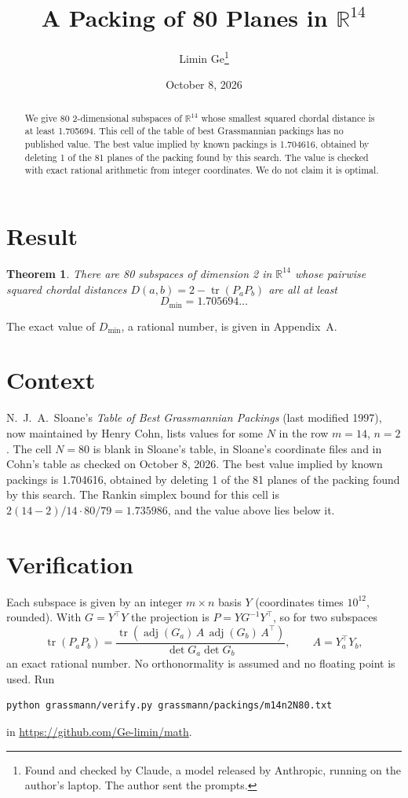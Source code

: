\documentclass[11pt,a4paper]{article}
\title{A Packing of 80 Planes in $\mathbb{R}^{14}$}
\author{Limin Ge\thanks{Found and checked by Claude, a model released by Anthropic, running on the author's laptop. The author sent the prompts.}}
\date{October 8, 2026}
\newtheorem*{theorem}{Theorem}
\begin{document}
\maketitle
\begin{abstract}
We give 80 2-dimensional subspaces of $\mathbb{R}^{14}$ whose smallest squared chordal distance is at least 1.705694. This cell of the table of best Grassmannian packings has no published value. The best value implied by known packings is 1.704616, obtained by deleting 1 of the 81 planes of the packing found by this search. The value is checked with exact rational arithmetic from integer coordinates. We do not claim it is optimal.
\end{abstract}

\section{Result}
\begin{theorem}
There are 80 subspaces of dimension 2 in $\mathbb{R}^{14}$ whose pairwise squared chordal distances $D(a,b) = 2 - \operatorname{tr}(P_aP_b)$ are all at least
\[ D_{\min} = 1.705694\ldots \]
\end{theorem}
The exact value of $D_{\min}$, a rational number, is given in Appendix~A.


\section{Context}
N.~J.~A.~Sloane's \emph{Table of Best Grassmannian Packings} (last modified 1997), now maintained by Henry Cohn, lists values for some $N$ in the row $m=14$, $n=2$. The cell $N=80$ is blank in Sloane's table, in Sloane's coordinate files and in Cohn's table as checked on October 8, 2026. The best value implied by known packings is 1.704616, obtained by deleting 1 of the 81 planes of the packing found by this search. The Rankin simplex bound for this cell is $2(14-2)/14\cdot 80/79 = 1.735986$, and the value above lies below it.


\section{Verification}
Each subspace is given by an integer $m\times n$ basis $Y$ (coordinates times $10^{12}$, rounded). With $G=Y^\top Y$ the projection is $P=YG^{-1}Y^\top$, so for two subspaces
\[ \operatorname{tr}(P_aP_b)=\frac{\operatorname{tr}(\operatorname{adj}(G_a)\,A\,\operatorname{adj}(G_b)\,A^\top)}{\det G_a\det G_b},\qquad A=Y_a^\top Y_b, \]
an exact rational number. No orthonormality is assumed and no floating point is used. Run
\begin{verbatim}
python grassmann/verify.py grassmann/packings/m14n2N80.txt
\end{verbatim}
in \url{https://github.com/Ge-limin/math}.
\end{document}
